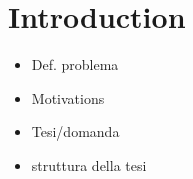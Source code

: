 \chapter{Introduction}

\begin{itemize}
	\item Def. problema
	\item Motivations
	\item Tesi/domanda
	\item struttura della tesi
\end{itemize}
